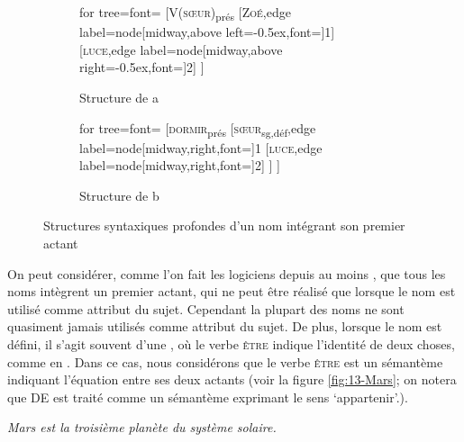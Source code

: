 \begin{figure}
	\begin{subfigure}[b]{0.5\textwidth}
		\centering
		\begin{forest} for tree={font=\normalfont}
			[V(\textsc{sœur})\textsubscript{prés}
				[\textsc{Zoé},edge label={node[midway,above left=-0.5ex,font=\footnotesize]{1}}]
				[\textsc{luce},edge label={node[midway,above right=-0.5ex,font=\footnotesize]{2}}]
			]
		\end{forest}
		\caption{Structure de a}
	\end{subfigure}%
	\hfill
	\begin{subfigure}[b]{0.5\textwidth}
		\centering
		\begin{forest} for tree={font=\normalfont}
			[\textsc{dormir}\textsubscript{prés}
			[\textsc{sœur}\textsubscript{sg,déf},edge label={node[midway,right,font=\footnotesize]{1}}
			[\textsc{luce},edge label={node[midway,right,font=\footnotesize]{2}}]
			]
			]
		\end{forest}
		\caption{Structure de b}
	\end{subfigure}
\caption{Structures syntaxiques profondes d’un nom intégrant son premier actant\label{fig:13-soeur-synt}}
\end{figure}

On peut considérer, comme l’on fait les logiciens depuis au moins \citet{frege1892uber}, que tous les noms intègrent un premier actant, qui ne peut être réalisé que lorsque le nom est utilisé comme attribut du sujet. Cependant la plupart des noms ne sont quasiment jamais utilisés comme attribut du sujet. De plus, lorsque le nom est défini, il s’agit souvent d’une , où le verbe \textsc{être} indique l’identité de deux choses, comme en . Dans ce cas, nous considérons que le verbe \textsc{être} est un sémantème indiquant l'équation entre ses deux actants (voir la figure \ref{fig:13-Mars}; on notera que DE est traité comme un sémantème exprimant le sens ‘appartenir’.).

\ea\label{ex:13-Mars} \textit{Mars est la troisième planète du système solaire.}\z

